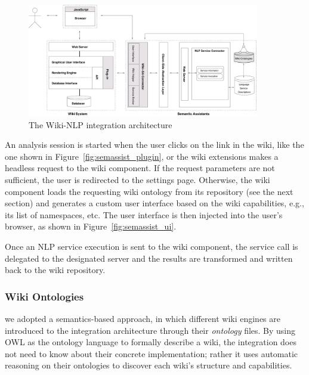\begin{figure}
\centering
\includegraphics[width=0.9\textwidth]{pictures/wikinlp_arch}
\caption{The Wiki-NLP integration architecture}
\label{fig:wikinlp_arch}
\end{figure}

An analysis session is started when the user clicks on the \sa link in the wiki, like the one shown in Figure~\ref{fig:semassist_plugin}, or the wiki extensions makes a headless request to the wiki component. If the request parameters are not sufficient, the user is redirected to the settings page. Otherwise, the wiki component loads the requesting wiki ontology from its repository (see the next section) and generates a custom user interface based on the wiki capabilities, e.g., its list of namespaces, etc. The user interface is then injected into the user's browser, as shown in Figure~\ref{fig:semassist_ui}.

Once an NLP service execution is sent to the wiki component, the service call is delegated to the designated \sa server and the results are transformed and written back to the wiki repository.

\subsubsection{Wiki Ontologies}

we adopted a semantics-based approach, in which different wiki engines are introduced to the integration architecture through their \emph{ontology} files. By using OWL as the ontology language to formally describe a wiki, the integration does not need to know about their concrete implementation; rather it uses automatic reasoning on their ontologies to discover each wiki's structure and capabilities.

